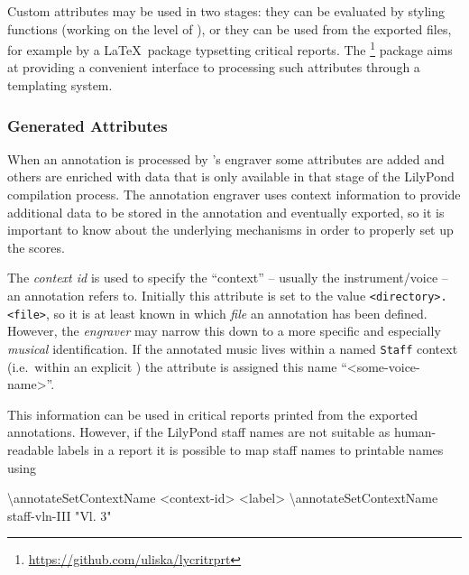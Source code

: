 \documentclass[]{ollmanual}
\newenvironment{Shaded}{}{}
\newcommand{\DataTypeTok}[1]{\textcolor[rgb]{0.56,0.13,0.00}{#1}}
\newcommand{\FunctionTok}[1]{\textcolor[rgb]{0.02,0.16,0.49}{#1}}
\newcommand{\NormalTok}[1]{#1}
\newcommand{\StringTok}[1]{\textcolor[rgb]{0.25,0.44,0.63}{#1}}
\begin{document}
Custom attributes may be used in two stages: they can be evaluated by
styling functions (working on the level of ), or they can
be used from the exported files, for example by a \LaTeX~package
typsetting critical reports. The \footnote{\url{https://github.com/uliska/lycritrprt}}
package aims at providing a convenient interface to processing such
attributes through a templating system.

\hypertarget{generated-attributes}{%
\subsubsection{Generated Attributes}\label{generated-attributes}}

When an annotation is processed by 's engraver some
attributes are added and others are enriched with data that is only
available in that stage of the LilyPond compilation process. The
annotation engraver uses context information to provide additional data
to be stored in the annotation and eventually exported, so it is
important to know about the underlying mechanisms in order to properly
set up the scores.


The \emph{context id} is used to specify the ``context'' -- usually the
instrument/voice -- an annotation refers to. Initially this attribute is
set to the value
\texttt{\textless{}directory\textgreater{}.\textless{}file\textgreater{}},
so it is at least known in which \emph{file} an annotation has been
defined. However, the \emph{engraver} may narrow this down to a more
specific and especially \emph{musical} identification. If the annotated
music lives within a named \texttt{Staff} context (i.e.~within an
explicit  ) the
 attribute is assigned this name
``\textless{}some-voice-name\textgreater{}''.

This information can be used in critical reports printed from the
exported annotations. However, if the LilyPond staff names are not
suitable as human-readable labels in a report it is possible to map
staff names to printable names using

\begin{Shaded}
\begin{Highlighting}[]
\FunctionTok{\textbackslash{}annotateSetContextName} \DataTypeTok{<}\NormalTok{context-id> }\DataTypeTok{<}\NormalTok{label>}
\FunctionTok{\textbackslash{}annotateSetContextName}\NormalTok{ staff-vln-III "}\StringTok{Vl. 3"}
\end{Highlighting}
\end{Shaded}
\end{document}
